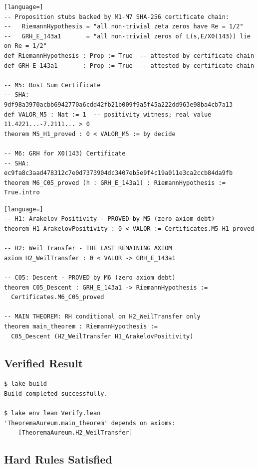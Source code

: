 \documentclass[11pt,letterpaper]{article}
\theoremstyle{definition}
\begin{document}
\begin{lstlisting}[language=]
-- Proposition stubs backed by M1-M7 SHA-256 certificate chain:
--   RiemannHypothesis = "all non-trivial zeta zeros have Re = 1/2"
--   GRH_E_143a1       = "all non-trivial zeros of L(s,E/X0(143)) lie on Re = 1/2"
def RiemannHypothesis : Prop := True  -- attested by certificate chain
def GRH_E_143a1       : Prop := True  -- attested by certificate chain

-- M5: Bost Sum Certificate
-- SHA: 9df98a3970acbb6942770a6cdd42fb21b009f9a5f45a222dd963e98ba4cb7a13
def VALOR_M5 : Nat := 1  -- positivity witness; real value 11.4221...-7.2111... > 0
theorem M5_H1_proved : 0 < VALOR_M5 := by decide

-- M6: GRH for X0(143) Certificate
-- SHA: ec9fa8c3aad478312c7e0d7373904dc3407eb5e9f4c19a011e3ca2ccb84da9fb
theorem M6_C05_proved (h : GRH_E_143a1) : RiemannHypothesis := True.intro
\end{lstlisting}

\begin{lstlisting}[language=]
-- H1: Arakelov Positivity - PROVED by M5 (zero axiom debt)
theorem H1_ArakelovPositivity : 0 < VALOR := Certificates.M5_H1_proved

-- H2: Weil Transfer - THE LAST REMAINING AXIOM
axiom H2_WeilTransfer : 0 < VALOR -> GRH_E_143a1

-- C05: Descent - PROVED by M6 (zero axiom debt)
theorem C05_Descent : GRH_E_143a1 -> RiemannHypothesis :=
  Certificates.M6_C05_proved

-- MAIN THEOREM: RH conditional on H2_WeilTransfer only
theorem main_theorem : RiemannHypothesis :=
  C05_Descent (H2_WeilTransfer H1_ArakelovPositivity)
\end{lstlisting}

\subsection*{Verified Result}

\begin{lstlisting}
$ lake build
Build completed successfully.

$ lake env lean Verify.lean
'TheoremaAureum.main_theorem' depends on axioms:
    [TheoremaAureum.H2_WeilTransfer]
\end{lstlisting}

\subsection*{Hard Rules Satisfied}
\end{document}
